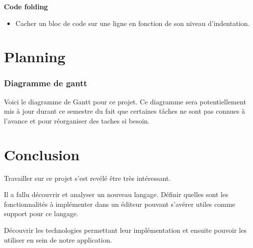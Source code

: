 \documentclass[
    iict, %
    il, %
]{heig-tb}
\begin{document}
\textbf{Code folding}
\begin{itemize}
    \item Cacher un bloc de code sur une ligne en fonction de son niveau d'indentation.
\end{itemize}


\chapter{Planning}


\subsection{Diagramme de gantt}
Voici le diagramme de Gantt pour ce projet.
Ce diagramme sera potentiellement mis à jour durant ce semestre du fait que certaines tâches ne sont pas connues à l'avance et pour réorganiser des taches si besoin.



\chapter{Conclusion}



Travailler sur ce projet s'est revélé être très intéressant.


Il a fallu découvrir et analyser un nouveau langage.
Définir quelles sont les fonctionnalités à implémenter dans un éditeur pouvant s'avérer utiles comme support pour ce langage.

Découvrir les technologies permettant leur implémentation et ensuite pouvoir les utiliser en sein de notre application. %
\end{document}
